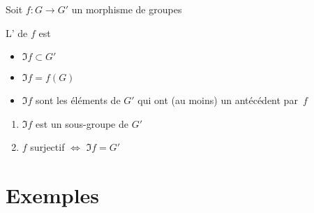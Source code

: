 \begin{frame}

Soit $f: G \longrightarrow G'$ un morphisme de groupes

\medskip

\begin{mydefinition}
L' de $f$ est 
\end{mydefinition}

\pause


\begin{itemize}
  \item $\Im f \subset G'$
  \item $\Im f = f(G)$
  \item $\Im f$ sont les éléments de $G'$ qui ont (au moins) un antécédent par~$f$
\end{itemize}  

\pause 


\begin{proposition}
\begin{enumerate}
  \item $\Im f$ est un sous-groupe de $G'$
  \item $f$ surjectif $\iff$ $\Im f = G'$
\end{enumerate}
\end{proposition}
  
\end{frame}





\section{Exemples}


